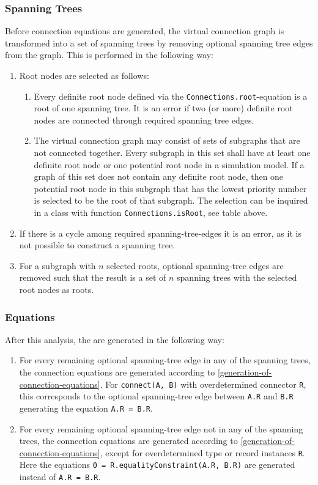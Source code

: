 \subsubsection{Spanning Trees}
Before connection equations are generated, the virtual connection graph is transformed into a set of spanning trees by removing optional spanning tree edges from the graph.
This is performed in the following way:
\begin{enumerate}
\item
  Root nodes are selected as follows:
\begin{enumerate}
\item
  Every definite root node defined via the \lstinline!Connections.root!-equation is a root of one spanning tree.
  It is an error if two (or more) definite root nodes are connected through required spanning tree edges.
\item
  The virtual connection graph may consist of sets of subgraphs that are not connected together.
  Every subgraph in this set shall have at least one definite root node or one potential root node in a simulation model.
  If a graph of this set does not contain any definite root node, then one potential root node in this subgraph that has the lowest priority number is selected to be the root of that subgraph.
  The selection can be inquired in a class with function \lstinline!Connections.isRoot!, see table above.
\end{enumerate}
\item
  If there is a cycle among required spanning-tree-edges it is an error, as it is not possible to construct a spanning tree.
\item
  For a subgraph with $n$ selected roots, optional spanning-tree edges are removed such that the result is a set of $n$ spanning trees with the selected root nodes as roots.
\end{enumerate}

\subsubsection{Equations}
After this analysis, the  are generated in the following way:
\begin{enumerate}
\item
  For every remaining optional spanning-tree edge in any of the spanning trees, the connection equations are generated according to \cref{generation-of-connection-equations}.
  For \lstinline!connect(A, B)! with overdetermined connector \lstinline!R!, this corresponds to the optional spanning-tree edge between \lstinline!A.R! and \lstinline!B.R! generating the equation \lstinline!A.R = B.R!.
\item
  For every remaining optional spanning-tree edge not in any of the spanning trees, the connection equations are generated according to \cref{generation-of-connection-equations}, except for overdetermined type or record instances \lstinline!R!.
  Here the equations \lstinline!0 = R.equalityConstraint(A.R, B.R)! are generated instead of \lstinline!A.R = B.R!.
\end{enumerate}

